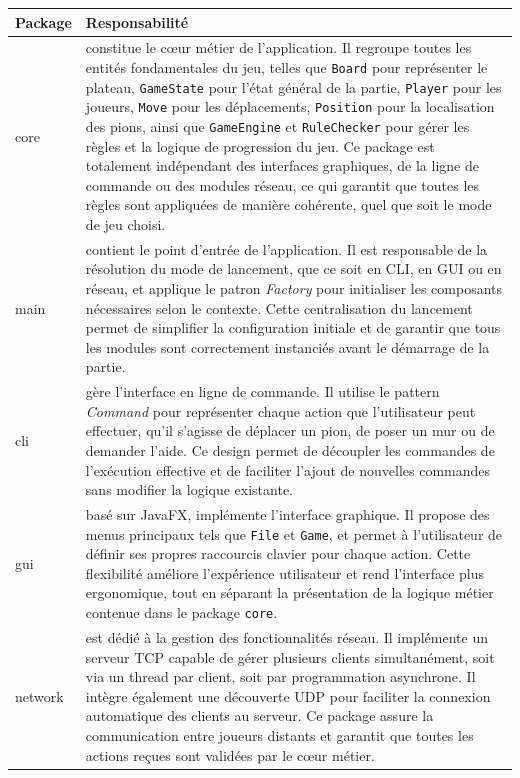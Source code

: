 \documentclass[a4paper]{article}
\begin{document}
\begin{table}[H]
\centering
\begin{tabular}{|p{2cm}|p{13cm}|}
    \hline
    \textbf{Package} & \textbf{Responsabilité} \\
    \hline
    core & constitue le cœur métier de l’application. Il regroupe toutes les entités fondamentales du jeu,
    telles que \texttt{Board} pour représenter le plateau, \texttt{GameState} pour l’état général de la partie,
    \texttt{Player} pour les joueurs, \texttt{Move} pour les déplacements, \texttt{Position} pour la localisation des pions,
    ainsi que \texttt{GameEngine} et \texttt{RuleChecker} pour gérer les règles et la logique de progression du jeu.
    Ce package est totalement indépendant des interfaces graphiques, de la ligne de commande ou des modules réseau,
    ce qui garantit que toutes les règles sont appliquées de manière cohérente, quel que soit le mode de jeu choisi. \\
    \hline
    main & contient le point d’entrée de l’application. Il est responsable de la résolution du mode de lancement,
    que ce soit en CLI, en GUI ou en réseau, et applique le patron \textit{Factory} pour initialiser les composants
    nécessaires selon le contexte. Cette centralisation du lancement permet de simplifier la configuration initiale
    et de garantir que tous les modules sont correctement instanciés avant le démarrage de la partie. \\
    \hline
    cli & gère l’interface en ligne de commande. Il utilise le pattern \textit{Command} pour représenter chaque action que l’utilisateur peut effectuer, qu’il s’agisse de déplacer un pion, de poser un mur ou de demander l’aide. Ce design permet de découpler les commandes de l’exécution effective et de faciliter l’ajout de nouvelles commandes sans modifier la logique existante. \\
    \hline
    gui & basé sur JavaFX, implémente l’interface graphique. Il propose des menus principaux tels que \texttt{File} et \texttt{Game}, et permet à l’utilisateur de définir ses propres raccourcis clavier pour chaque action. Cette flexibilité améliore l’expérience utilisateur et rend l’interface plus ergonomique, tout en séparant la présentation de la logique métier contenue dans le package \texttt{core}.\\
    \hline
    network & est dédié à la gestion des fonctionnalités réseau. Il implémente un serveur TCP capable de gérer plusieurs clients simultanément, soit via un thread par client, soit par programmation asynchrone. Il intègre également une découverte UDP pour faciliter la connexion automatique des clients au serveur. Ce package assure la communication entre joueurs distants et garantit que toutes les actions reçues sont validées par le cœur métier. \\

\end{tabular}
\end{table}
\end{document}
